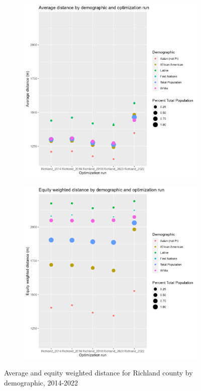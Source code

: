 \documentclass[11pt]{article}
\theoremstyle{remark}
\theoremstyle{definition}
\begin{document}
\begin{figure}
	\begin{subfigure}{.8\textwidth}
		\centering
		\includegraphics[width=.8\linewidth]{result analysis/Richland_SC_original_configs/orig_pop_scaled_avg}
		\label{sfig:Richland avg dist}
	\end{subfigure} \newline
	\begin{subfigure}{.8\textwidth}
		\centering
		\includegraphics[width=.8\linewidth]{result analysis/Richland_SC_original_configs/orig_pop_scaled_y_EDE}
		\label{sfig:Richland equity dist}
	\end{subfigure}
	\caption{Average and equity weighted distance for Richland county by demographic, 2014-2022}
	\label{fig:Richland distance graphs}
\end{figure}
\end{document}

